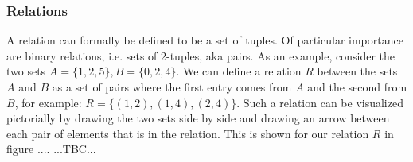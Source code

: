 


\subsubsection{Relations}
A relation can formally be defined to be a set of tuples. Of particular importance are binary relations, i.e. sets of 2-tuples, aka pairs. As an example, consider the two sets $A = \{1,2,5\}, B = \{0,2,4\}$. We can define a relation $R$ between the sets $A$ and $B$ as a set of pairs where the first entry comes from $A$ and the second from $B$, for example: $R = \{(1,2),(1,4),(2,4)\}$. Such a relation can be visualized pictorially by drawing the two sets side by side and drawing an arrow between each pair of elements that is in the relation. This is shown for our relation $R$ in figure .... ...TBC...


